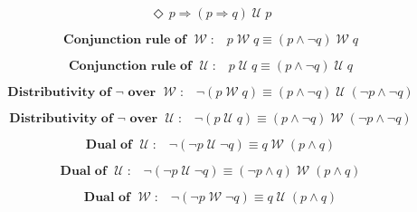 \documentclass[12pt, fleqn, leqno]{article}
\newcommand{\impl}{\ensuremath{\Rightarrow}}        %
\newcommand{\Until}{\;\mathcal{U}\;}
\newcommand{\Wait}{\;\mathcal{W}\;}
\newcommand{\Event}{\Diamond\,}
\newcommand{\spacer}{\vspace{-30pt}}
\begin{document}
\spacer

\begin{equation}\label{E:eventPImplPImplUntilp}
\Event p\impl(p\impl q)\Until p
\end{equation}

\spacer


\begin{equation}\label{E:conRuleWait}
\textbf{Conjunction rule of $\Wait$:}\quad p\Wait q\equiv (p\land \neg q)\Wait q
\end{equation}

\spacer

\begin{equation}\label{E:conRuleUntil}
\textbf{Conjunction rule of $\Until$:}\quad p\Until q\equiv (p\land \neg q)\Until q
\end{equation}

\spacer

\begin{equation}\label{E:notWait2}
\textbf{Distributivity of $\neg$ over $\Wait$:}\quad \neg(p\Wait q)\equiv (p\land \neg q)\Until(\neg p\land \neg q)
\end{equation}

\spacer

\begin{equation}\label{E:notUntil2}
\textbf{Distributivity of $\neg$ over $\Until$:}\quad \neg(p\Until q)\equiv (p\land \neg q)\Wait(\neg p\land \neg q)
\end{equation}

\spacer

\begin{equation}\label{E:DualUntil1}
\textbf{Dual of $\Until$:}\quad \neg (\neg p \Until \neg q) \equiv q \Wait (p \land q)
\end{equation}

\spacer

\begin{equation}\label{E:DualUntil2}
\textbf{Dual of $\Until$:}\quad \neg (\neg p \Until \neg q) \equiv ( \neg p \land q) \Wait (p \land q)
\end{equation}

\spacer

\begin{equation}\label{E:DualWait1}
\textbf{Dual of $\Wait$:}\quad \neg (\neg p \Wait \neg q) \equiv q \Until (p \land q)
\end{equation}
\end{document}
